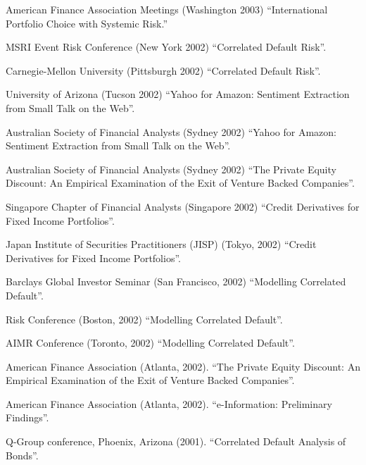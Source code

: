 \documentclass{article}
\begin{document}
\begin{etaremune}
{\item American Finance Association Meetings (Washington 2003)
``International Portfolio Choice with Systemic Risk.''


\item MSRI Event Risk Conference (New York 2002)
``Correlated Default Risk''.

\item Carnegie-Mellon University (Pittsburgh 2002)
``Correlated Default Risk''.



\item University of Arizona (Tucson 2002)
``Yahoo for Amazon: Sentiment Extraction from Small Talk on the Web''. 

\item Australian Society of Financial Analysts (Sydney 2002)
``Yahoo for Amazon: Sentiment Extraction from Small Talk on the Web''. 

\item Australian Society of Financial Analysts (Sydney 2002)
``The Private Equity Discount: An Empirical Examination of the
Exit of Venture Backed Companies''.


\item Singapore Chapter of Financial Analysts (Singapore 2002)
``Credit Derivatives for Fixed Income Portfolios''.

\item Japan Institute of Securities Practitioners (JISP) (Tokyo, 2002)
``Credit Derivatives for Fixed Income Portfolios''.


\item Barclays Global Investor Seminar (San Francisco, 2002) 
``Modelling Correlated Default''.

\item Risk Conference (Boston, 2002) 
``Modelling Correlated Default''.

\item AIMR Conference (Toronto, 2002) 
``Modelling Correlated Default''.

\item American Finance Association (Atlanta, 2002).
``The Private Equity Discount: An Empirical Examination of the
Exit of Venture Backed Companies''.

\item American Finance Association (Atlanta, 2002).
``e-Information: Preliminary Findings''.

\item Q-Group conference, Phoenix, Arizona (2001). 
``Correlated Default Analysis of Bonds''.

}
\end{etaremune}
\end{document}
